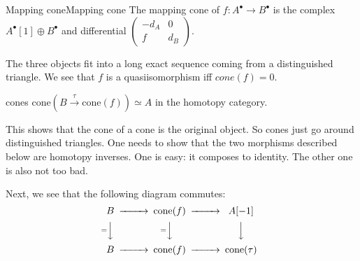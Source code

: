 \begin{definition}{Mapping cone}{Mapping cone}
    The mapping cone of $f:A^\bullet\xrightarrow{}B^\bullet$ is the complex $A^\bullet[1]\oplus B^\bullet$ and differential $\begin{pmatrix} -d_A & 0 \\ f & d_B
\end{pmatrix}$.\end{definition}

The three objects fit into a long exact sequence coming from a distinguished triangle. We see that $f$ is a quasiisomorphism iff $cone(f)=0$. 

\begin{proposition}{}{cones}
    $\mathrm{cone}(B\xrightarrow{\tau} \mathrm{cone}(f))\simeq A$ in the homotopy category.
\end{proposition}

This shows that the cone of a cone is the original object. So cones just go around distinguished triangles. One needs to show that the two morphisms described below are homotopy inverses. One is easy: it composes to identity. The other one is also not too bad.


Next, we see that the following diagram commutes:$$\begin{CD} B @> > > \mathrm{cone}(f)@> > > A[-1] \\ @V=VV @V=VV @VVV\\B @> > > \mathrm{cone}(f) @> > > \mathrm{cone(\tau)}\end{CD}$$

